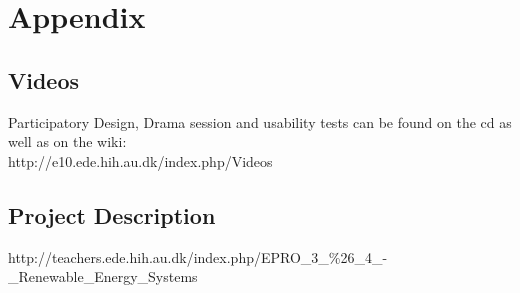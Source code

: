 \chapter{Appendix}
\section{Videos}
Participatory Design, Drama session and usability tests can be found on the cd as well as on the wiki:
\\ http://e10.ede.hih.au.dk/index.php/Videos

\section{Project Description}
http://teachers.ede.hih.au.dk/index.php/EPRO\_3\_\%26\_4\_-\_Renewable\_Energy\_Systems
